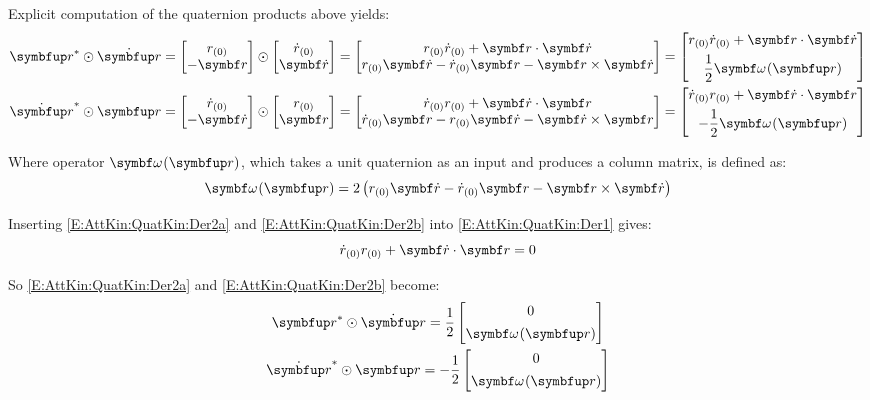 Explicit computation of the quaternion products above yields:
\begin{subequations}
	\begin{gather}
		\qcon{\quat{\rotq}} \qprod \dot{\quat{\rotq}} =
		\qcol{\qreal{\rotq}}{-\qvec{\rotq}} \qprod \qcol{\qreal{\dot{\rotq}}}{\qvec{\dot{\rotq}}} =
		\qcol
		{\qreal{\rotq} \qreal{\dot{\rotq}} + \qvec{\rotq} \cdot \qvec{\dot{\rotq}} }
		{\qreal{\rotq} \qvec{\dot{\rotq}} - \qreal{\dot{\rotq}} \qvec{\rotq} - \qvec{\rotq} \times \qvec{\dot{\rotq}}} = 
		\qcol[1ex]
		{\qreal{\rotq} \qreal{\dot{\rotq}} + \qvec{\rotq} \cdot \qvec{\dot{\rotq}} }
		{\dfrac{1}{2} \qvangv{\quat{\rotq}}} \label{E:AttKin:QuatKin:Der2a}
		\\
		\qcon{\dot{\quat{\rotq}}} \qprod \quat{\rotq} =
		\qcol{\qreal{\dot{\rotq}}}{-\qvec{\dot{\rotq}}} \qprod \qcol{\qreal{\rotq}}{\qvec{\rotq}} =
		\qcol
		{\qreal{\dot{\rotq}} \qreal{\rotq} + \qvec{\dot{\rotq}} \cdot \qvec{\rotq} }
		{\qreal{\dot{\rotq}} \qvec{\rotq} - \qreal{\rotq} \qvec{\dot{\rotq}} - \qvec{\dot{\rotq}} \times \qvec{\rotq}} = 
		\qcol[1ex]
		{\qreal{\dot{\rotq}} \qreal{\rotq} + \qvec{\dot{\rotq}} \cdot \qvec{\rotq} }
		{-\dfrac{1}{2} \qvangv{\quat{\rotq}}} \label{E:AttKin:QuatKin:Der2b}
	\end{gather}
\end{subequations}

Where operator $\qvangv{\quat{\rotq}}$, which takes a unit quaternion as an input and produces a column matrix, is defined as:
\begin{equation} \label{E:AttKin:QuatKin:OmegaOp}
	\qvangv{\quat{\rotq}} = 2 \left( \qreal{\rotq} \qvec{\dot{\rotq}} - \qreal{\dot{\rotq}} \qvec{\rotq} - \qvec{\rotq} \times \qvec{\dot{\rotq}} \right) 
\end{equation}

Inserting \eqref{E:AttKin:QuatKin:Der2a} and \eqref{E:AttKin:QuatKin:Der2b} into \eqref{E:AttKin:QuatKin:Der1} gives:
\begin{equation*}
	\qreal{\dot{\rotq}} \qreal{\rotq} + \qvec{\dot{\rotq}} \cdot \qvec{\rotq} = 0
\end{equation*}

So \eqref{E:AttKin:QuatKin:Der2a} and \eqref{E:AttKin:QuatKin:Der2b} become:
\begin{subequations}
\begin{gather}
	\qcon{\quat{\rotq}} \qprod \dot{\quat{\rotq}} =\dfrac{1}{2} 
	\qcol[1ex]
	{0}
	{\qvangv{\quat{\rotq}}} \label{E:AttKin:QuatKin:Der3a}
	\\
	\qcon{\dot{\quat{\rotq}}} \qprod \quat{\rotq} =-\dfrac{1}{2} 
	\qcol[1ex]
	{0}
	{\qvangv{\quat{\rotq}}} \label{E:AttKin:QuatKin:Der3b}
\end{gather}
\end{subequations}

